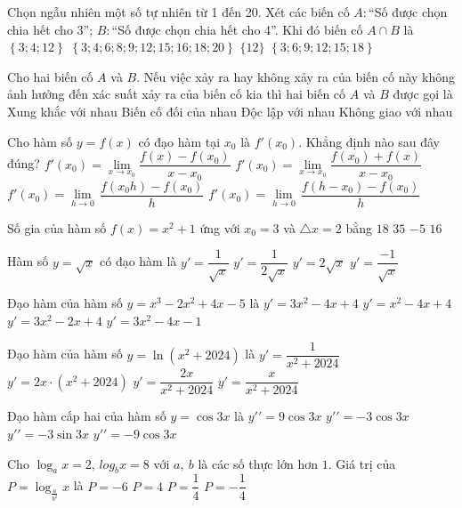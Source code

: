 \begin{ex}
Chọn ngẫu nhiên một số tự nhiên từ 1 đến 20. Xét các biến cố $A\colon $“Số được chọn chia hết cho 3”; $B\colon $“Số được chọn chia hết cho 4”. Khi đó biến cố $A\cap B$ là
\choice
{$\left\{ 3;4;12 \right\}$}
{$\left\{ 3;4;6;8;9;12;15;16;18;20 \right\}$}
{$\{12\}$}
{$\left\{ 3;6;9;12;15;18 \right\}$}
\end{ex}
\begin{ex}
Cho hai biến cố $A$ và $B$. Nếu việc xảy ra hay không xảy ra của biến cố này không ảnh hưởng đến xác suất xảy ra của biến cố kia thì hai biến cố $A$ và $B$ được gọi là
\choice
{Xung khắc với nhau}
{Biến cố đối của nhau}
{Độc lập với nhau}
{Không giao với nhau}
\end{ex}
\begin{ex}
Cho hàm số $y=f(x)$ có đạo hàm tại $x_0$ là $f'\left(x_0\right)$. Khẳng định nào sau đây đúng?
\choice
{$f'\left(x_0\right)= \lim \limits_{x\to x_0} \dfrac{f(x)-f\left(x_0\right)}{x-x_0}$}
{$f'\left(x_0\right)= \lim \limits_{x\to x_0} \dfrac{f\left(x_0\right)+f(x)}{x-x_0}$}
{$f'\left(x_0\right)= \lim \limits_{h \to 0} \,\dfrac{f\left(x_0h\right)-f\left(x_0\right)}{h}$}
{$f'\left(x_0\right)= \lim \limits_{h\to 0} \,\dfrac{f\left(h-x_0\right)-f\left(x_0\right)}{h}$}
\end{ex}
\begin{ex}
Số gia của hàm số $f(x)=x^2+1$ ứng với $x_0=3$ và $\triangle x=2$ bằng
\choice
{$18$}
{$35$}
{$-5$}
{$16$}
\end{ex}
\begin{ex}
Hàm số $y=\sqrt{x}$ có đạo hàm là
\choice
{$y'=\dfrac{1}{\sqrt{x}}$}
{$y'=\dfrac{1}{2\sqrt{x}}$}
{$y'=2\sqrt{x}$}
{$y'=\dfrac{-1}{\sqrt{x}}$}
\end{ex}
\begin{ex}
Đạo hàm của hàm số $y=x^3-2x^2+4x-5$ là
\choice
{$y'=3x^2-4x+4$}
{$y'=x^2-4x+4$}
{$y'=3x^2-2x+4$}
{$y'=3x^2-4x-1$}
\end{ex}
\begin{ex}
Đạo hàm của hàm số $y=\ln \left(x^2+2024\right)$ là
\choice
{$y'=\dfrac{1}{x^2+2024}$}
{$y'=2x \cdot \left(x^2+2024\right)$}
{$y'=\dfrac{2x}{x^2+2024}$}
{$y'=\dfrac{x}{x^2+2024}$}
\end{ex}
\begin{ex}
Đạo hàm cấp hai của hàm số $y=\cos 3x$ là
\choice
{${y'}'=9\cos 3x$}
{${y'}'=-3\cos 3x$}
{${y'}'=-3\sin 3x$}
{${y'}'=-9\cos 3x$}
\end{ex}
\begin{ex}
Cho $\log _ax=2$, $log _bx=8$ với $a,\ b$ là các số thực lớn hơn $1$. Giá trị của
$P=\log_{\tfrac{a}{b^2}}x$ là
\choice
{$P=-6$}
{$P=4$}
{$P=\dfrac{1}{4}$}
{$P=-\dfrac{1}{4}$}
\end{ex}
